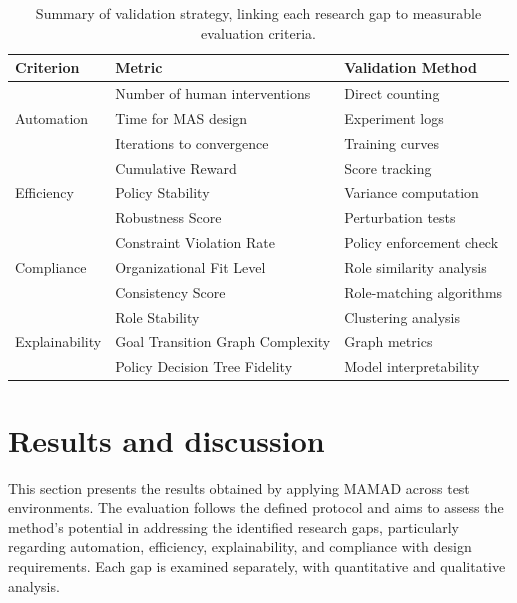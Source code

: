 \documentclass[journal]{IEEEtai}
\begin{document}
\begin{table}[h!]
    \centering
    \begin{tabular}{|l|l|l|}
        \hline
        \textbf{Criterion} & \textbf{Metric} & \textbf{Validation Method} \\
        \hline
        \multirow{3}{*}{Automation} & Number of human interventions & Direct counting \\
                                    & Time for MAS design & Experiment logs \\
                                    & Iterations to convergence & Training curves \\
        \hline
        \multirow{3}{*}{Efficiency} & Cumulative Reward & Score tracking \\
                                    & Policy Stability & Variance computation \\
                                    & Robustness Score & Perturbation tests \\
        \hline
        \multirow{3}{*}{Compliance} & Constraint Violation Rate & Policy enforcement check \\
                                    & Organizational Fit Level & Role similarity analysis \\
                                    & Consistency Score & Role-matching algorithms \\
        \hline
        \multirow{3}{*}{Explainability} & Role Stability & Clustering analysis \\
                                        & Goal Transition Graph Complexity & Graph metrics \\
                                        & Policy Decision Tree Fidelity & Model interpretability \\
        \hline
    \end{tabular}
    \caption{Summary of validation strategy, linking each research gap to measurable evaluation criteria.}
\end{table}

\clearpage

\section{Results and discussion} \label{sec:results}

This section presents the results obtained by applying MAMAD across test environments. The evaluation follows the defined protocol and aims to assess the method's potential in addressing the identified research gaps, particularly regarding automation, efficiency, explainability, and compliance with design requirements. Each gap is examined separately, with quantitative and qualitative analysis.
\end{document}
